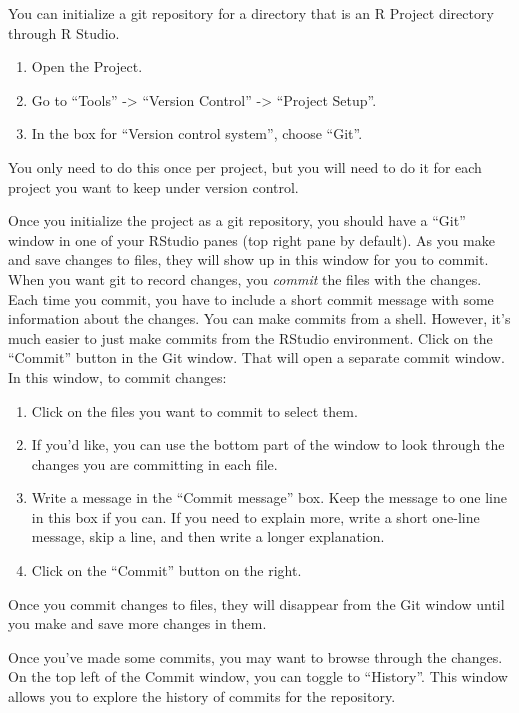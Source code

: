 \documentclass[]{tufte-book}
\providecommand{\tightlist}{%
  \setlength{\itemsep}{0pt}\setlength{\parskip}{0pt}}
\begin{document}
You can initialize a git repository for a directory that is an R Project
directory through R Studio.

\begin{enumerate}
\def\labelenumi{\arabic{enumi}.}
\tightlist
\item
  Open the Project.
\item
  Go to ``Tools'' -\textgreater{} ``Version Control'' -\textgreater{} ``Project Setup''.
\item
  In the box for ``Version control system'', choose ``Git''.
\end{enumerate}

You only need to do this once per project, but you will need to do it for each
project you want to keep under version control.

Once you initialize the project as a git repository, you should have a ``Git''
window in one of your RStudio panes (top right pane by default). As you make and
save changes to files, they will show up in this window for you to commit. When
you want git to record changes, you \emph{commit} the files with the changes. Each
time you commit, you have to include a short commit message with some
information about the changes. You can make commits from a shell. However, it's
much easier to just make commits from the RStudio environment. Click on the
``Commit'' button in the Git window. That will open a separate commit window. In
this window, to commit changes:

\begin{enumerate}
\def\labelenumi{\arabic{enumi}.}
\tightlist
\item
  Click on the files you want to commit to select them.
\item
  If you'd like, you can use the bottom part of the window to look through the
  changes you are committing in each file.
\item
  Write a message in the ``Commit message'' box. Keep the message to one line in
  this box if you can. If you need to explain more, write a short one-line
  message, skip a line, and then write a longer explanation.
\item
  Click on the ``Commit'' button on the right.
\end{enumerate}

Once you commit changes to files, they will disappear from the Git window until
you make and save more changes in them.

Once you've made some commits, you may want to browse through the changes. On
the top left of the Commit window, you can toggle to ``History''. This window
allows you to explore the history of commits for the repository.
\end{document}
